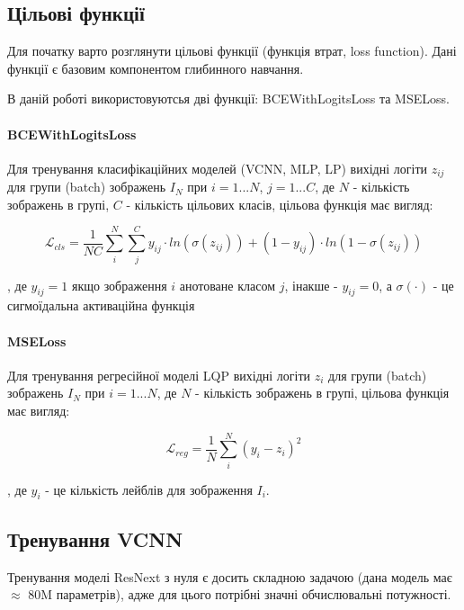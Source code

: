 \documentclass{udstu}
\begin{document}
\subsection{Цільові функції}

Для початку варто розглянути цільові функції (функція втрат, loss function).
Дані функції є базовим компонентом глибинного навчання.

В даній роботі використовуютсья дві функції: BCEWithLogitsLoss та MSELoss.

\paragraph{\textbf{BCEWithLogitsLoss}\\}

Для тренування класифікаційних моделей (VCNN, MLP, LP) вихідні логіти $z_{ij}$
для групи (batch) зображень $I_N$ при $i = 1...N$, $j = 1...C$,
де $N$ - кількість зображень в групі, $C$ - кількість цільових класів,
цільова функція має вигляд:

\begin{equation}
\mathcal{L}_{cls} = \frac{1}{NC} \sum_{i}^{N} \sum_{j}^{C}
y_{ij} \cdot ln(\sigma(z_{ij})) + (1 - y_{ij}) \cdot ln(1 - \sigma(z_{ij}))
\end{equation}

, де $y_{ij} = 1$ якщо зображення $i$ анотоване класом $j$, інакше - $y_{ij} = 0$,
а $\sigma(\cdot)$ - це сигмоїдальна активаційна функція

\paragraph{\textbf{MSELoss}\\}

Для тренування регресійної моделі LQP вихідні логіти $z_i$
для групи (batch) зображень $I_N$ при $i = 1...N$,
де $N$ - кількість зображень в групі,
цільова функція має вигляд:

\begin{equation}
\mathcal{L}_{reg} = \frac{1}{N} \sum_{i}^{N}
(y_i - z_i)^2
\end{equation}

, де $y_i$ - це кількість лейблів для зображення $I_i$.


\subsection{Тренування VCNN}

Тренування моделі ResNext \cite{resnext} з нуля є досить складною задачою (дана модель має $\approx$ 80M параметрів),
адже для цього потрібні значні обчислювальні потужності.
\end{document}
